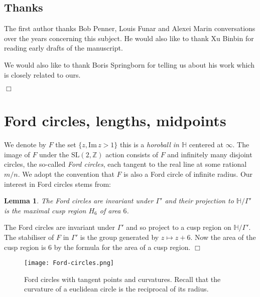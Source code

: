 \documentclass[12pt,a4paper]{amsart}
\newtheorem{lem}[thm]{Lemma}
\def\HH{\mathbb{H}}
\def\im{\mathrm{Im}\,}
\def\xx{\HH/\Gamma'}
\def\ZZ{\mathbb{Z}}
\def\sl2{\mathrm{SL}(2, \ZZ)}
\begin{document}
 

\subsection{Thanks}

The first author thanks Bob Penner, Louis Funar and Alexei Marin
conversations over the years concerning this subject. He would also like to
thank Xu Binbin for reading early drafts of the manuscript.

We would also like to thank Boris Springborn  for telling us about his work
\cite{spring} which is closely related to ours.

\hfill $\Box$


\section{Ford circles, lengths, midpoints} 
\label{lengths}

We denote by $F$ the set  $\{ z, \im z > 1\}$ this is a \textit{horoball in
$\HH$} centered at $\infty$. The image of $F$ under the $\sl2$ action consists
of $F$ and infinitely many disjoint circles, the so-called \textit{Ford
circles}, each tangent to the real line at some rational $m/n$. We adopt the
convention that $F$ is also a Ford circle of infinite radius. Our interest in
Ford circles stems from:

\begin{lem}
The Ford circles are invariant under $\Gamma'$ and their projection to $\xx$ 
is the maximal cusp region $H_6$ of area $6$.
\end{lem}

\proof The Ford circles are invariant under $\Gamma'$ and so project to a cusp
region on $\xx$. The stabiliser of $F$ in $\Gamma'$ is the group generated by
$z \mapsto z + 6$. Now the area of the cusp region is $6$ by the formula for
the area of a cusp region. \hfill $\Box$

\begin{figure}[ht]
\begin{center}
\texttt{[image: Ford-circles.png]} 
\end{center}
\caption{Ford circles with tangent points and curvatures.
Recall that the curvature of a euclidean circle is the reciprocal of its radius.}
\end{figure}
\end{document}
